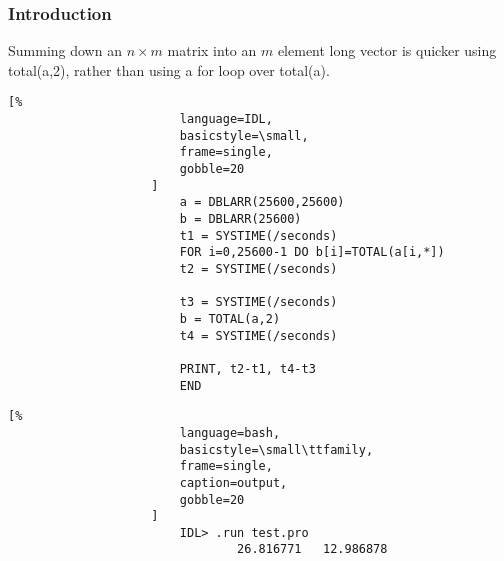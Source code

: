 \documentclass[crop=false,class=book,oneside]{standalone}
\begin{document}
            \subsubsection{Introduction}
                Summing down an $n\times{m}$ matrix into an $m$ element
                long vector is quicker using total(a,2), rather than using
                a for loop over total(a).
                \newline
                \begin{minipage}[t]{.48\textwidth}
                    \centering
                    \begin{lstlisting}[%
                        language=IDL,
                        basicstyle=\small,
                        frame=single,
                        gobble=20
                    ]
                        a = DBLARR(25600,25600)
                        b = DBLARR(25600)
                        t1 = SYSTIME(/seconds)
                        FOR i=0,25600-1 DO b[i]=TOTAL(a[i,*])
                        t2 = SYSTIME(/seconds)
        
                        t3 = SYSTIME(/seconds)
                        b = TOTAL(a,2)
                        t4 = SYSTIME(/seconds)
        
                        PRINT, t2-t1, t4-t3
                        END
                    \end{lstlisting}
                \end{minipage}\hfill
                \begin{minipage}[t]{.48\textwidth}
                    \centering
                    \begin{lstlisting}[%
                        language=bash,
                        basicstyle=\small\ttfamily,
                        frame=single,
                        caption=output,
                        gobble=20
                    ]
                        IDL> .run test.pro
                                26.816771   12.986878
                    \end{lstlisting}
                \end{minipage}
\end{document}
